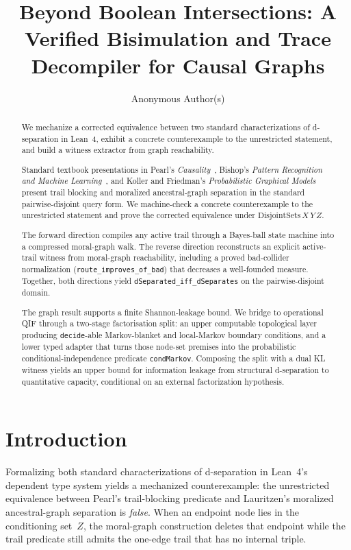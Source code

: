\documentclass[acmsmall,screen,review,anonymous,nonacm]{acmart}
\title{Beyond Boolean Intersections: A Verified Bisimulation and Trace Decompiler for Causal Graphs}
\author{Anonymous Author(s)}
\affiliation{%
  \institution{Anonymous Institution}
}
\newcommand{\lean}[1]{\lstinline!#1!}
\begin{document}
\begin{abstract}
We mechanize a corrected equivalence between two standard characterizations of
d-separation in Lean~4, exhibit a concrete counterexample to the unrestricted
statement, and build a witness extractor from graph reachability.

Standard textbook presentations in Pearl's \emph{Causality}~\cite{pearl2009causality},
Bishop's \emph{Pattern Recognition and Machine Learning}~\cite{bishop2006prml},
and Koller and Friedman's \emph{Probabilistic Graphical Models}~\cite{koller2009probabilistic}
present trail blocking and moralized ancestral-graph separation in the standard
pairwise-disjoint query form.  We machine-check a concrete counterexample to the
unrestricted statement and prove the corrected equivalence under
$\text{DisjointSets}\,X\,Y\,Z$.

The forward direction compiles any active trail through a Bayes-ball state
machine into a compressed moral-graph walk.  The reverse direction
reconstructs an explicit active-trail witness from moral-graph reachability,
including a proved bad-collider normalization (\lean{route_improves_of_bad})
that decreases a well-founded measure.  Together, both directions yield
\lean{dSeparated_iff_dSeparates} on the pairwise-disjoint domain.

The graph result supports a finite Shannon-leakage bound.  We bridge to
operational QIF through a two-stage factorisation split: an upper computable
topological layer producing \lean{decide}-able Markov-blanket and local-Markov
boundary conditions, and a lower typed adapter that turns those node-set
premises into the probabilistic conditional-independence predicate
\lean{condMarkov}.  Composing the split with a dual KL witness yields an upper
bound for information leakage from structural d-separation to quantitative
capacity, conditional on an external factorization hypothesis.
\end{abstract}
\maketitle

\section{Introduction}\label{sec:intro}

Formalizing both standard characterizations of d-separation in
Lean~4's dependent type system yields a mechanized counterexample: the
unrestricted equivalence between Pearl's trail-blocking predicate and
Lauritzen's moralized ancestral-graph separation is \emph{false}.  When an
endpoint node lies in the conditioning set~$Z$, the moral-graph construction
deletes that endpoint while the trail predicate still admits the one-edge trail
that has no internal triple.
\end{document}
